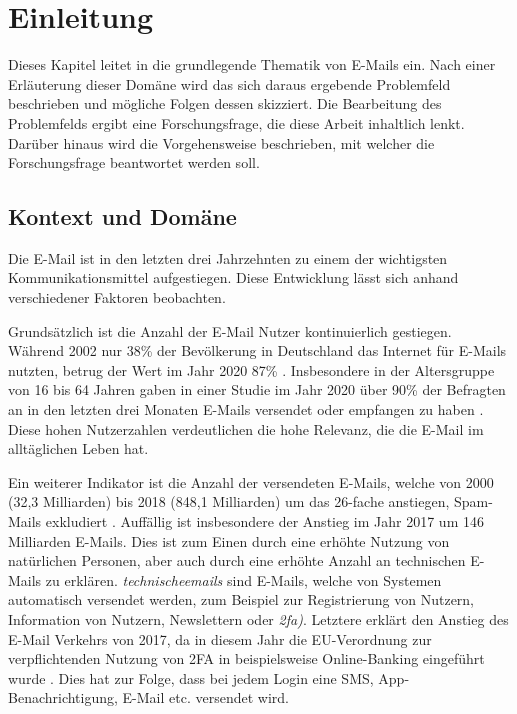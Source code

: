 
\chapter{Einleitung}
\label{Einleitung}

Dieses Kapitel leitet in die grundlegende Thematik von E-Mails ein. Nach einer Erläuterung dieser Domäne wird das sich daraus ergebende Problemfeld beschrieben und mögliche Folgen dessen skizziert. Die Bearbeitung des Problemfelds ergibt eine Forschungsfrage, die diese Arbeit inhaltlich lenkt. Darüber hinaus wird die Vorgehensweise beschrieben, mit welcher die Forschungsfrage beantwortet werden soll.

\section{Kontext und Domäne}
\label{Kontext_und_Domaene}
Die E-Mail ist in den letzten drei Jahrzehnten zu einem der wichtigsten Kommunikationsmittel aufgestiegen. Diese Entwicklung lässt sich anhand verschiedener Faktoren beobachten.

Grundsätzlich ist die Anzahl der E-Mail Nutzer kontinuierlich gestiegen. Während 2002 nur 38\% der Bevölkerung in Deutschland das Internet für E-Mails nutzten, betrug der Wert im Jahr 2020 87\% \citep{SAEU2022}. Insbesondere in der Altersgruppe von 16 bis 64 Jahren gaben in einer Studie im Jahr 2020 über 90\% der Befragten an in den letzten drei Monaten E-Mails versendet oder empfangen zu haben \citep{StatistischesBundesamt2021}. Diese hohen Nutzerzahlen verdeutlichen die hohe Relevanz, die die E-Mail im alltäglichen Leben hat.

Ein weiterer Indikator ist die Anzahl der versendeten E-Mails, welche von 2000 (32,3 Milliarden) bis 2018 (848,1 Milliarden) um das 26-fache anstiegen, Spam-Mails exkludiert \citep{MMG2018}. Auffällig ist insbesondere der Anstieg im Jahr 2017 um 146 Milliarden E-Mails. Dies ist zum Einen durch eine erhöhte Nutzung von natürlichen Personen, aber auch durch eine erhöhte Anzahl an technischen E-Mails zu erklären.  \textit{\gls{technischeemail}s} sind E-Mails, welche von Systemen automatisch versendet werden, zum Beispiel zur Registrierung von Nutzern, Information von Nutzern, Newslettern oder \textit{\acrfull{2fa})}. Letztere erklärt den Anstieg des E-Mail Verkehrs von 2017, da in diesem Jahr die EU-Verordnung zur verpflichtenden Nutzung von 2FA in beispielsweise Online-Banking eingeführt wurde \citep{EuropaeischeKommission2017}. Dies hat zur Folge, dass bei jedem Login eine SMS, App-Benachrichtigung, E-Mail etc. versendet wird.

